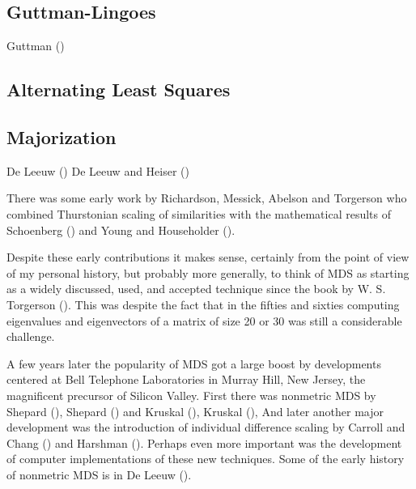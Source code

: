 \documentclass[
  12pt,
  letterpaper,
  DIV=11,
  numbers=noendperiod]{scrartcl}
\begin{document}
\subsection{Guttman-Lingoes}\label{guttman-lingoes}

Guttman ()

\subsection{Alternating Least Squares}\label{alternating-least-squares}

\subsection{Majorization}\label{majorization}

De Leeuw () De Leeuw and Heiser
()

There was some early work by Richardson, Messick, Abelson and Torgerson
who combined Thurstonian scaling of similarities with the mathematical
results of Schoenberg () and Young and
Householder ().

Despite these early contributions it makes sense, certainly from the
point of view of my personal history, but probably more generally, to
think of MDS as starting as a widely discussed, used, and accepted
technique since the book by W. S. Torgerson
(). This was despite the fact that in
the fifties and sixties computing eigenvalues and eigenvectors of a
matrix of size 20 or 30 was still a considerable challenge.

A few years later the popularity of MDS got a large boost by
developments centered at Bell Telephone Laboratories in Murray Hill, New
Jersey, the magnificent precursor of Silicon Valley. First there was
nonmetric MDS by Shepard (), Shepard
() and Kruskal
(), Kruskal
(), And later another major development
was the introduction of individual difference scaling by Carroll and
Chang () and Harshman
(). Perhaps even more important was the
development of computer implementations of these new techniques. Some of
the early history of nonmetric MDS is in De Leeuw
().
\end{document}
